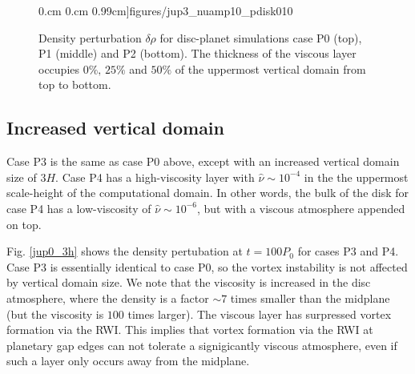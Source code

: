 \begin{figure}
     0.cm 0.cm
     0.99cm]{figures/jup3_nuamp10_pdisk010}\\%
   \caption{Density perturbation $\delta\rho$ for disc-planet
     simulations case P0 (top), P1 (middle) and P2 (bottom). The
     thickness of the viscous layer occupies $0\%,\,25\%$ and $50\%$
     of the uppermost vertical domain from top to bottom. 
   \label{jup0}}
 \end{figure}

\subsection{Increased vertical domain}
Case P3 is the same as case P0 above, except with an increased
vertical domain size of $3H$. Case P4 has a high-viscosity layer with
$\hat{\nu}\sim10^{-4}$ in the the uppermost scale-height of the
computational domain. In other words, the bulk of the 
disk for case P4 has a low-viscosity of $\hat{\nu}\sim10^{-6}$, but
with a viscous atmosphere appended on top.  

Fig. \ref{jup0_3h} shows the density pertubation at $t=100P_0$ for
cases P3 and P4. Case P3 is essentially identical to case P0, so the
vortex instability is not affected by vertical domain size. We note
that the viscosity is increased in the disc atmosphere, where the
density is a factor $\sim 7$ times smaller than the midplane (but the
viscosity is $100$ times larger). The viscous layer has surpressed
vortex formation via the RWI. This implies that vortex formation via
the RWI at planetary gap edges can not tolerate a signigicantly
viscous atmosphere, even if such a layer only occurs away from the
midplane.    

